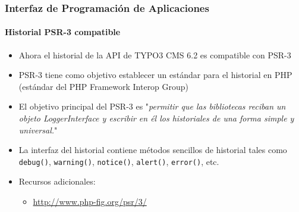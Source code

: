 \begin{frame}[fragile]
	\frametitle{Interfaz de Programación de Aplicaciones}
	\framesubtitle{Historial PSR-3 compatible}

	\begin{itemize}
		\item Ahora el historial de la API de TYPO3 CMS 6.2 es compatible con PSR-3
		\item PSR-3 tiene como objetivo establecer un estándar para el historial en PHP (estándar del PHP Framework Interop Group)

		\item El objetivo principal del PSR-3 es
			"\emph{permitir que las bibliotecas reciban un objeto LoggerInterface y escribir en él los historiales de una forma simple y universal.}"

		\item La interfaz del historial contiene métodos sencillos de historial tales como\newline
			\texttt{debug()}, \texttt{warning()}, \texttt{notice()}, \texttt{alert()}, \texttt{error()}, etc.

		\item Recursos adicionales:
			\begin{itemize}
				\item \url{http://www.php-fig.org/psr/3/}
			\end{itemize}

	\end{itemize}

\end{frame}


